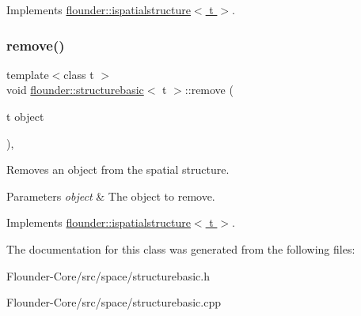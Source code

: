 Implements \hyperlink{classflounder_1_1ispatialstructure_aa27638201d27f6140a84c0e3c917f405}{flounder\+::ispatialstructure$<$ t $>$}.

\mbox{\label{classflounder_1_1structurebasic_a30ae1add25079e6bed1709b72d1d89e2}} 
\subsubsection{\texorpdfstring{remove()}{remove()}}
{\footnotesize\ttfamily template$<$class t $>$ \\
void \hyperlink{classflounder_1_1structurebasic}{flounder\+::structurebasic}$<$ t $>$\+::remove (\begin{DoxyParamCaption}\item[{t}]{object }\end{DoxyParamCaption})\hspace{0.3cm}{\ttfamily [override]}, {\ttfamily [virtual]}}



Removes an object from the spatial structure. 


\begin{DoxyParams}{Parameters}
{\em object} & The object to remove. \\
\hline
\end{DoxyParams}


Implements \hyperlink{classflounder_1_1ispatialstructure_afca84e244d4bf34d474f0c2456d493b1}{flounder\+::ispatialstructure$<$ t $>$}.



The documentation for this class was generated from the following files\+:\begin{DoxyCompactItemize}
\item 
Flounder-\/\+Core/src/space/structurebasic.\+h\item 
Flounder-\/\+Core/src/space/structurebasic.\+cpp\end{DoxyCompactItemize}
